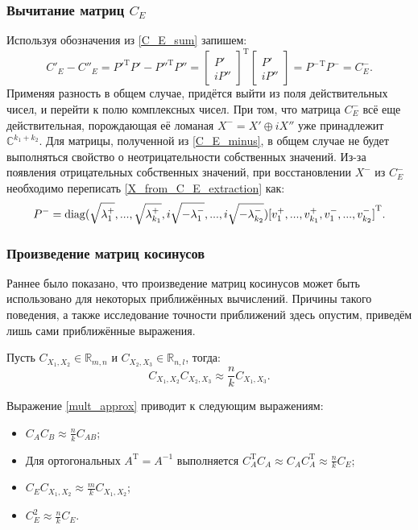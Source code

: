 \subsubsection{Вычитание матриц $C_E$}
Используя обозначения из \ref{C_E_sum} запишем:
\begin{equation}
	C'_E - C''_E = {P'}^\mathrm{T}P' - {P''}^\mathrm{T}P'' = {\begin{bmatrix} P' \\ iP'' \end{bmatrix}}^\mathrm{T}{\begin{bmatrix} P' \\ iP'' \end{bmatrix}} = {P^{-}}^\mathrm{T}P^{-} = C_E^{-}.
	\label{C_E_minus}
\end{equation}
Применяя разность в общем случае, придётся выйти из поля действительных чисел, и перейти к полю комплексных чисел. При том, что матрица $C_E^{-}$ всё еще действительная, порождающая её ломаная $X^{-} = X' \oplus iX''$ уже принадлежит $\mathbb{C}^{k_1 + k_2}$. Для матрицы, полученной из \ref{C_E_minus}, в общем случае не будет выполняться свойство о неотрицательности собственных значений. Из-за появления отрицательных собственных значений, при восстановлении $X^{-}$ из $C_E^{-}$ необходимо переписать \ref{X_from_C_E_extraction} как:
\begin{equation}
	P^{-} = \operatorname{diag}(\sqrt{\lambda_1^{+}}, ..., \sqrt{\lambda_{k_1}^{+}}, i\sqrt{-\lambda_1^{-}}, ..., i\sqrt{-\lambda_{k_2}^{-}}){[v_1^{+}, ..., v_{k_1}^{+}, v_1^{-}, ..., v_{k_2}^{-}]}^\mathrm{T}.
	\label{X_from_C_E_extraction_min}
\end{equation}

\subsubsection{Произведение матриц косинусов}
Раннее было показано, что произведение матриц косинусов может быть использовано для некоторых приближённых вычислений. Причины такого поведения, а также исследование
точности приближений здесь опустим, приведём лишь сами приближённые выражения.

Пусть $C_{X_1, X_2} \in \mathbb{R}_{m, n}$ и $C_{X_2, X_3} \in \mathbb{R}_{n, l}$, тогда:
\begin{equation}
	C_{X_1, X_2}C_{X_2, X_3} \approx \frac{n}{k}C_{X_1, X_3}.
	\label{mult_approx}
\end{equation}

Выражение \ref{mult_approx} приводит к следующим выражениям:
\begin{itemize}
\item $C_AC_B \approx \frac{n}{k}C_{AB}$;
\item Для ортогональных $A^\mathrm{T} = A^{-1}$ выполняется $C_A^\mathrm{T}C_A \approx C_AC_A^\mathrm{T} \approx \frac{n}{k}C_E$;
\item $C_EC_{X_1, X_2} \approx \frac{m}{k}C_{X_1, X_2}$;
\item $C_E^2 \approx \frac{n}{k}C_E$.
\end{itemize}

